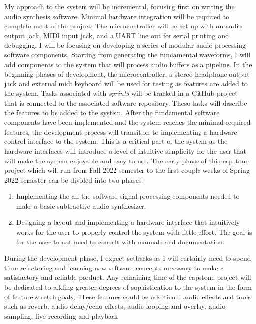 \documentclass[12pt]{article}
\begin{document}
My approach to the system will be incremental, focusing first on writing the audio synthesis software. Minimal hardware integration will be required to complete most of the project; The microcontroller will be set up with an audio output jack, MIDI input jack, and a UART line out for serial printing and debugging. I will be focusing on developing a series of modular audio processing software components. Starting from generating the fundamental waveforms, I will add components to the system that will process audio buffers as a pipeline. In the beginning phases of development, the microcontroller, a stereo headphone output jack and external midi keyboard will be used for testing as features are added to the system. Tasks associated with \textit{sprints} will be tracked in a GitHub project that is connected to the associated software repository. These tasks will describe the features to be added to the system. After the fundamental software components have been implemented and the system reaches the minimal required features, the development process will transition to implementing a hardware control interface to the system. This is a critical part of the system as the hardware interfaces will introduce a level of intuitive simplicity for the user that will make the system enjoyable and easy to use. The early phase of this capstone project which will run from Fall 2022 semester to the first couple weeks of Spring 2022 semester can be divided into two phases:

\begin{enumerate}
    \item Implementing the all the software signal processing components needed to make a basic subtractive audio synthesizer.
    \item Designing a layout and implementing a hardware interface that intuitively works for the user to properly control the system with little effort. The goal is for the user to not need to consult with manuals and documentation. 
\end{enumerate}

During the development phase, I expect setbacks as I will certainly need to spend time refactoring and learning new software concepts necessary to make a satisfactory and reliable product. Any remaining time of the capstone project will be dedicated to adding greater degrees of sophistication to the system in the form of feature stretch goals; These features could be additional audio effects and tools such as reverb, audio delay/echo effects, audio looping and overlay, audio sampling, live recording and playback
\end{document}
